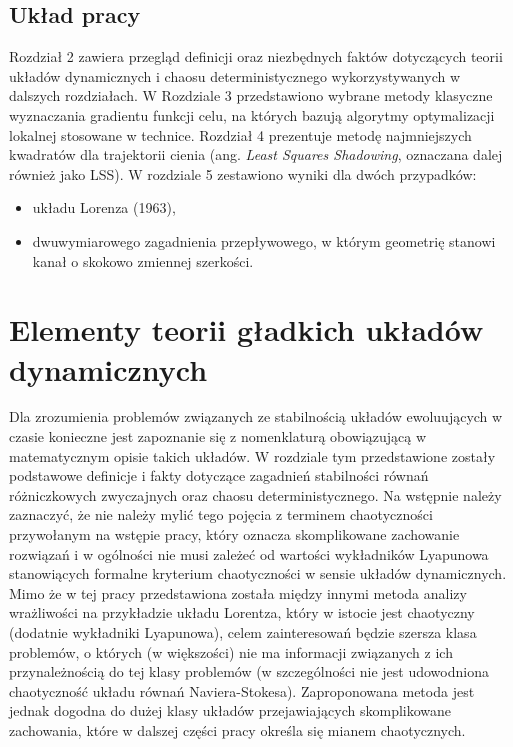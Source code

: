 \documentclass[12pt]{article}
\begin{document}
\subsection{Układ pracy}
Rozdział 2 zawiera przegląd definicji oraz niezbędnych faktów dotyczących teorii układów dynamicznych i chaosu deterministycznego wykorzystywanych w dalszych rozdziałach. W Rozdziale 3 przedstawiono wybrane metody klasyczne wyznaczania gradientu funkcji celu, na których bazują algorytmy optymalizacji lokalnej stosowane w technice.  Rozdział 4 prezentuje metodę najmniejszych kwadratów dla trajektorii cienia (ang. \textit{Least Squares Shadowing}, oznaczana dalej również jako LSS). W rozdziale 5 zestawiono wyniki dla dwóch przypadków:
\begin{itemize}
	\item układu Lorenza (1963),
	\item dwuwymiarowego zagadnienia przepływowego, w którym geometrię stanowi kanał o skokowo zmiennej szerkości.
\end{itemize}
\newpage
\newpage
\section{Elementy teorii gładkich układów dynamicznych}
Dla zrozumienia problemów związanych ze stabilnością układów ewoluujących w czasie konieczne jest zapoznanie się z nomenklaturą obowiązującą w matematycznym opisie takich układów. W rozdziale tym przedstawione zostały podstawowe definicje i fakty dotyczące zagadnień stabilności równań różniczkowych zwyczajnych oraz chaosu deterministycznego. Na wstępnie należy zaznaczyć, że nie należy mylić tego pojęcia z terminem chaotyczności przywołanym na wstępie pracy, który oznacza skomplikowane zachowanie rozwiązań i w ogólności nie musi zależeć od wartości wykładników Lyapunowa stanowiących formalne kryterium chaotyczności w sensie układów dynamicznych. Mimo że w tej pracy przedstawiona została między innymi metoda analizy wrażliwości na przykładzie układu Lorentza, który w istocie jest chaotyczny (dodatnie wykładniki Lyapunowa), celem zainteresowań będzie szersza klasa problemów, o których (w większości) nie ma informacji związanych z ich przynależnością do tej klasy problemów (w szczególności nie jest udowodniona chaotyczność układu równań Naviera-Stokesa). Zaproponowana metoda jest jednak dogodna do dużej klasy układów przejawiających skomplikowane zachowania, które w dalszej części pracy określa się mianem chaotycznych.\newline
\end{document}
